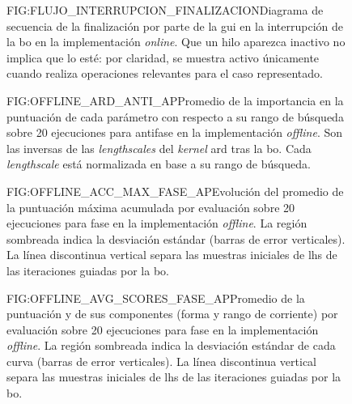 \begin{figure}[Sincronización de los hilos en la finalización de la interrupción de la \acl{bo} en la implementación \textit{online}]{FIG:FLUJO_INTERRUPCION_FINALIZACION}{Diagrama de secuencia de la finalización por parte de la \ac{gui} en la interrupción de la \ac{bo} en la implementación \textit{online}. Que un hilo aparezca inactivo no implica que lo esté: por claridad, se muestra activo únicamente cuando realiza operaciones relevantes para el caso representado.}
\end{figure}



\begin{figure}[Promedio de la importancia en la puntuación de los parámetros de la \acl{bo} \textit{offline} en antifase]{FIG:OFFLINE_ARD_ANTI_AP}{Promedio de la importancia en la puntuación de cada parámetro con respecto a su rango de búsqueda sobre 20 ejecuciones para antifase en la implementación \textit{offline}. Son las inversas de las \textit{lengthscales} del \textit{kernel} \ac{ard} tras la \ac{bo}. Cada \textit{lengthscale} está normalizada en base a su rango de búsqueda.}
\end{figure}

\begin{figure}[Promedio de la puntuación máxima acumulada por evaluación de la \acl{bo} \textit{offline} en fase]{FIG:OFFLINE_ACC_MAX_FASE_AP}{Evolución del promedio de la puntuación máxima acumulada por evaluación sobre 20 ejecuciones para fase en la implementación \textit{offline}. La región sombreada indica la desviación estándar (barras de error verticales). La línea discontinua vertical separa las muestras iniciales de \ac{lhs} de las iteraciones guiadas por la \ac{bo}.}
\end{figure}

\begin{figure}[Promedio de la puntuación y sus componentes por evaluación de la \acl{bo} \textit{offline} en fase]{FIG:OFFLINE_AVG_SCORES_FASE_AP}{Promedio de la puntuación y de sus componentes (forma y rango de corriente) por evaluación sobre 20 ejecuciones para fase en la implementación \textit{offline}. La región sombreada indica la desviación estándar de cada curva (barras de error verticales). La línea discontinua vertical separa las muestras iniciales de \ac{lhs} de las iteraciones guiadas por la \ac{bo}.}
\end{figure}

